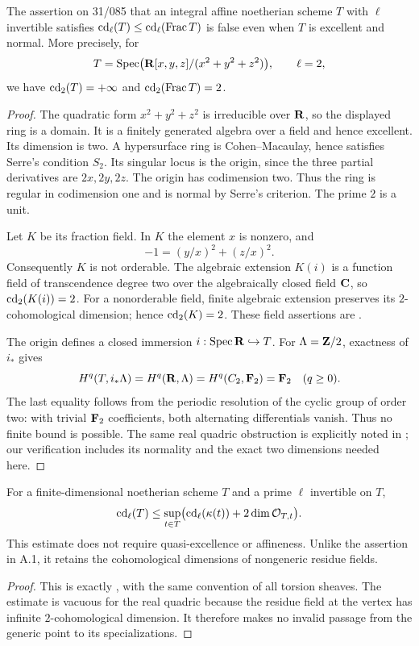 \begin{theorem}
\label{A:realcone}
The assertion on 31/085 that an integral affine noetherian scheme $T$ with $\ell$ invertible satisfies $\operatorname{cd}_\ell(T)\leq\operatorname{cd}_\ell(\operatorname{Frac} T)$ is false even when $T$ is excellent and normal. More precisely, for
\[
T=\operatorname{Spec}\bigl(\mathbf R[x,y,z]/(x^2+y^2+z^2)\bigr),\qquad \ell=2,
\]
we have $\operatorname{cd}_2(T)=+\infty$ and $\operatorname{cd}_2(\operatorname{Frac} T)=2$.
\end{theorem}
\begin{proof}
The quadratic form $x^2+y^2+z^2$ is irreducible over $\mathbf R$, so the displayed ring is a domain. It is a finitely generated algebra over a field and hence excellent. Its dimension is two. A hypersurface ring is Cohen--Macaulay, hence satisfies Serre's condition $S_2$. Its singular locus is the origin, since the three partial derivatives are $2x,2y,2z$. The origin has codimension two. Thus the ring is regular in codimension one and is normal by Serre's criterion. The prime $2$ is a unit.

Let $K$ be its fraction field. In $K$ the element $x$ is nonzero, and
\[
-1=(y/x)^2+(z/x)^2.
\]
Consequently $K$ is not orderable. The algebraic extension $K(i)$ is a function field of transcendence degree two over the algebraically closed field $\mathbf C$, so $\operatorname{cd}_2(K(i))=2$. For a nonorderable field, finite algebraic extension preserves its $2$-cohomological dimension; hence $\operatorname{cd}_2(K)=2$. These field assertions are \citet[Exposé X, Théorème 2.1 and its finite-extension input]{A_SGA4}.

The origin defines a closed immersion $i:\operatorname{Spec}\mathbf R\hookrightarrow T$. For $\Lambda=\mathbf Z/2$, exactness of $i_*$ gives
\[
H^q(T,i_*\Lambda)=H^q(\mathbf R,\Lambda)=H^q(C_2,\mathbf F_2)=\mathbf F_2
\quad(q\geq0).
\]
The last equality follows from the periodic resolution of the cyclic group of order two: with trivial $\mathbf F_2$ coefficients, both alternating differentials vanish. Thus no finite bound is possible. The same real quadric obstruction is explicitly noted in \citet[Exposé X, Exemple 4.5]{A_SGA4}; our verification includes its normality and the exact two dimensions needed here.
\end{proof}

\begin{proposition}
\label{A:general-upper}
For a finite-dimensional noetherian scheme $T$ and a prime $\ell$ invertible on $T$,
\[
\operatorname{cd}_\ell(T)\leq
\sup_{t\in T}\bigl(\operatorname{cd}_\ell(\kappa(t))+2\dim\mathcal O_{T,t}\bigr).
\]
This estimate does not require quasi-excellence or affineness. Unlike the assertion in A.1, it retains the cohomological dimensions of nongeneric residue fields.
\end{proposition}
\begin{proof}
This is exactly \citet[Exposé XVIII$_A$, Lemma 2.2]{A_ILO2014}, with the same convention of all torsion sheaves. The estimate is vacuous for the real quadric because the residue field at the vertex has infinite $2$-cohomological dimension. It therefore makes no invalid passage from the generic point to its specializations.
\end{proof}

